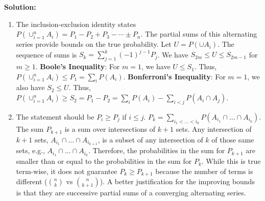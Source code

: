\noindent\textbf{Solution:}
\begin{enumerate}[label=(\alph*)]
    \item The inclusion-exclusion identity states $P(\cup_{i=1}^{n} A_i) = P_1 - P_2 + P_3 - \cdots \pm P_n$. The partial sums of this alternating series provide bounds on the true probability. Let $U = P(\cup A_i)$.
    \vspace{1ex} %
    The sequence of sums is $S_k = \sum_{j=1}^k (-1)^{j-1} P_j$. We have $S_{2m} \le U \le S_{2m-1}$ for $m \ge 1$.
    \vspace{1ex} %
    \textbf{Boole's Inequality}: For $m=1$, we have $U \le S_1$. Thus, $P(\cup_{i=1}^{n} A_i) \leq P_1 = \sum_i P(A_i)$.
    \vspace{1ex} %
    \textbf{Bonferroni's Inequality}: For $m=1$, we also have $S_2 \le U$. Thus, $P(\cup_{i=1}^{n} A_i) \geq S_2 = P_1 - P_2 = \sum_i P(A_i) - \sum_{i<j} P(A_i \cap A_j)$.

    \item The statement should be $P_i \ge P_j$ if $i \le j$.
    $P_k = \sum_{i_1 < \dots < i_k} P(A_{i_1} \cap \dots \cap A_{i_k})$. The sum $P_{k+1}$ is a sum over intersections of $k+1$ sets. Any intersection of $k+1$ sets, $A_{i_1} \cap \dots \cap A_{i_{k+1}}$, is a subset of any intersection of $k$ of those same sets, e.g., $A_{i_1} \cap \dots \cap A_{i_k}$. Therefore, the probabilities in the sum for $P_{k+1}$ are smaller than or equal to the probabilities in the sum for $P_k$. While this is true term-wise, it does not guarantee $P_k \ge P_{k+1}$ because the number of terms is different ($\binom{n}{k}$ vs $\binom{n}{k+1}$). A better justification for the improving bounds is that they are successive partial sums of a converging alternating series.


\end{enumerate}
